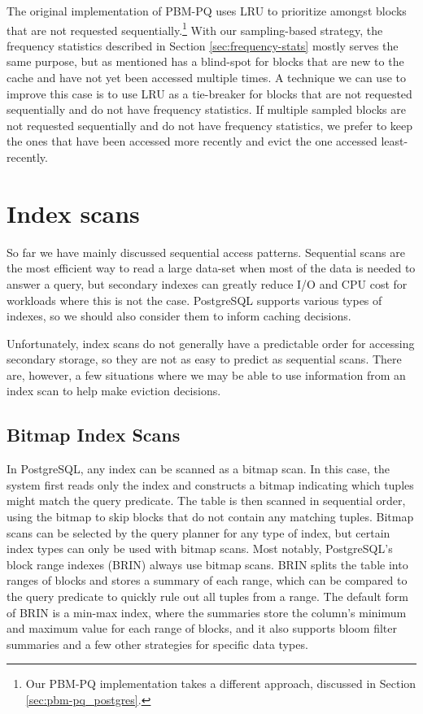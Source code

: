 The original implementation of PBM-PQ \cite{pbm} uses LRU to prioritize amongst blocks that are not requested sequentially.\footnote{Our PBM-PQ implementation takes a different approach, discussed in Section \ref{sec:pbm-pq_postgres}.} With our sampling-based strategy, the frequency statistics described in Section \ref{sec:frequency-stats} mostly serves the same purpose, but as mentioned has a blind-spot for blocks that are new to the cache and have not yet been accessed multiple times. A technique we can use to improve this case is to use LRU as a tie-breaker for blocks that are not requested sequentially and do not have frequency statistics. If multiple sampled blocks are not requested sequentially and do not have frequency statistics, we prefer to keep the ones that have been accessed more recently and evict the one accessed least-recently. %


\section{\label{sec:index_scans}Index scans}

So far we have mainly discussed sequential access patterns. Sequential scans are the most efficient way to read a large data-set when most of the data is needed to answer a query, but secondary indexes can greatly reduce I/O and CPU cost for workloads where this is not the case. PostgreSQL supports various types of indexes, so we should also consider them to inform caching decisions.

Unfortunately, index scans do not generally have a predictable order for accessing secondary storage, so they are not as easy to predict as sequential scans. There are, however, a few situations where we may be able to use information from an index scan to help make eviction decisions.

\subsection{\label{sec:bitmap_scans}Bitmap Index Scans}

In PostgreSQL, any index can be scanned as a bitmap scan. In this case, the system first reads only the index and constructs a bitmap indicating which tuples might match the query predicate. The table is then scanned in sequential order, using the bitmap to skip blocks that do not contain any matching tuples. Bitmap scans can be selected by the query planner for any type of index, but certain index types can only be used with bitmap scans. Most notably, PostgreSQL's block range indexes (BRIN) always use bitmap scans. BRIN splits the table into ranges of blocks and stores a summary of each range, which can be compared to the query predicate to quickly rule out all tuples from a range. The default form of BRIN is a min-max index, where the summaries store the column's minimum and maximum value for each range of blocks, and it also supports bloom filter summaries and a few other strategies for specific data types.


